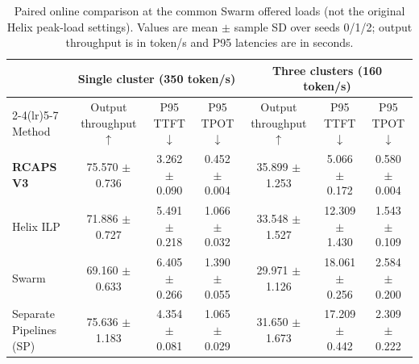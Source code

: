 \begin{table}[t]
\centering
\caption{Paired online comparison at the common Swarm offered loads (not the original Helix peak-load settings). Values are mean $\pm$ sample SD over seeds 0/1/2; output throughput is in token/s and P95 latencies are in seconds.}
\label{tab:v3-four-methods}
\scriptsize
\begin{tabular*}{\textwidth}{@{\extracolsep{\fill}}lcccccc@{}}
\toprule
 & \multicolumn{3}{c}{Single cluster (350 token/s)} & \multicolumn{3}{c}{Three clusters (160 token/s)} \\
\cmidrule(lr){2-4}\cmidrule(lr){5-7}
Method & Output throughput$\uparrow$ & P95 TTFT$\downarrow$ & P95 TPOT$\downarrow$ & Output throughput$\uparrow$ & P95 TTFT$\downarrow$ & P95 TPOT$\downarrow$ \\
\midrule
\textbf{RCAPS V3} & 75.570 $\pm$ 0.736 & 3.262 $\pm$ 0.090 & 0.452 $\pm$ 0.004 & 35.899 $\pm$ 1.253 & 5.066 $\pm$ 0.172 & 0.580 $\pm$ 0.004 \\
Helix ILP & 71.886 $\pm$ 0.727 & 5.491 $\pm$ 0.218 & 1.066 $\pm$ 0.032 & 33.548 $\pm$ 1.527 & 12.309 $\pm$ 1.430 & 1.543 $\pm$ 0.109 \\
Swarm & 69.160 $\pm$ 0.633 & 6.405 $\pm$ 0.266 & 1.390 $\pm$ 0.055 & 29.971 $\pm$ 1.126 & 18.061 $\pm$ 0.256 & 2.584 $\pm$ 0.200 \\
Separate Pipelines (SP) & 75.636 $\pm$ 1.183 & 4.354 $\pm$ 0.081 & 1.065 $\pm$ 0.029 & 31.650 $\pm$ 1.673 & 17.209 $\pm$ 0.442 & 2.309 $\pm$ 0.222 \\
\bottomrule
\end{tabular*}
\end{table}
